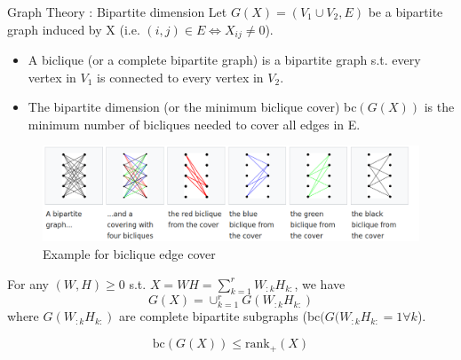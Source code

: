 \begin{frame}{Graph Theory : Bipartite dimension}
Let $G(X) = (V_1 \cup V_2, E)$ be a bipartite graph induced by X (i.e. $(i,j)\in E \Leftrightarrow X_{ij}\neq 0$).
\begin{defn}
\begin{itemize}
\item A biclique (or a complete bipartite graph) is a bipartite graph s.t. every vertex in $V_1$ is connected to every vertex in $V_2$. 
\item The bipartite dimension (or the minimum biclique cover) bc$(G(X))$ is the minimum number of bicliques needed to cover all edges in E.
\end{itemize} 
\end{defn}
\begin{figure}
\centering
\includegraphics[scale=0.18]{Section4/biclique.png}
\caption{Example for biclique edge cover \cite{biclique}}
\end{figure}
\end{frame}

\begin{frame}
For any $(W,H)\geq 0$ s.t. $X = WH = \sum_{k=1}^r W_{:k}H_{k:}$, we have 
\[G(X) = \cup_{k=1}^r G(W_{:k}H_{k:})
\]
where $G(W_{:k}H_{k:})$ are complete bipartite subgraphs (bc$(G(W_{:k}H_{k:} = 1 \forall k$).

\begin{thm}
\[\text{bc}(G(X))\leq \text{rank}_+(X)
\]
\end{thm}
\end{frame}

